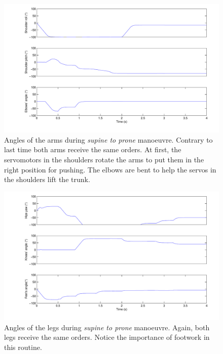 \begin{figure}[htp]
\centering
    \includegraphics[width = \textwidth]{figures/prone2standArms}
    \caption[Angles of the arms during \emph{supine} to prone manoeuvre]{Angles of the arms during \emph{supine to prone} manoeuvre. Contrary to last time both arms receive the same orders. At first, the servomotors in the shoulders rotate the arms to put them in the right position for pushing. The elbows are bent to help the servos in the shoulders lift the trunk.}
    \label{fig:prone2standArms}
\end{figure}

\begin{figure}[htp]
\centering
    \includegraphics[width = \textwidth]{figures/prone2standLegs}
    \caption[Angles of the legs during \emph{supine to prone} manoeuvre]{Angles of the legs during \emph{supine to prone} manoeuvre. Again, both legs receive the same orders. Notice the importance of footwork in this routine.}
    \label{fig:prone2standLegs}
\end{figure}


